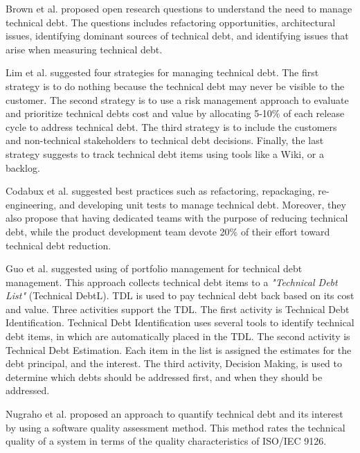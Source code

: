 Brown et al.\cite{foser076-brown} proposed open research questions to understand the need to manage technical debt. The questions includes refactoring opportunities, architectural issues, identifying dominant sources of technical debt, and identifying issues that arise when measuring technical debt.

Lim et al.\cite{lim-taksande} suggested four strategies for managing technical debt. The first strategy is to do nothing because the technical debt may never be visible to the customer. The second strategy is to use a risk management approach to evaluate and prioritize technical debts cost and value by allocating 5-10\% of each release cycle to address technical debt. The third strategy is to include the customers and non-technical stakeholders to technical debt decisions. Finally, the last strategy suggests to track technical debt items using tools like a Wiki, or a backlog.

Codabux et al.\cite{p8-codabux} suggested best practices such as refactoring, repackaging, re-engineering, and developing unit tests to manage technical debt. Moreover, they also propose that having dedicated teams with the purpose of reducing technical debt, while the product development team devote 20\% of their effort toward technical debt reduction.
	
Guo et al.\cite{p31-guo} suggested using of portfolio management for technical debt management. This approach collects technical debt items to a \textit{"Technical Debt List"} (Technical DebtL). TDL is used to pay technical debt back based on its cost and value. Three activities support the TDL. The first activity is Technical Debt Identification. Technical Debt Identification uses several tools to identify technical debt items, in which are automatically placed in the TDL. The second activity is Technical Debt Estimation. Each item in the list is assigned the estimates for the debt principal, and the interest. The third activity, Decision Making, is used to determine which debts should be addressed first, and when they should be addressed.

Nugraho et al.\cite{p1-nugraho} proposed an approach to quantify technical debt and its interest by using a software quality assessment method. This method rates the technical quality of a system in terms of the quality characteristics of ISO/IEC 9126. 

